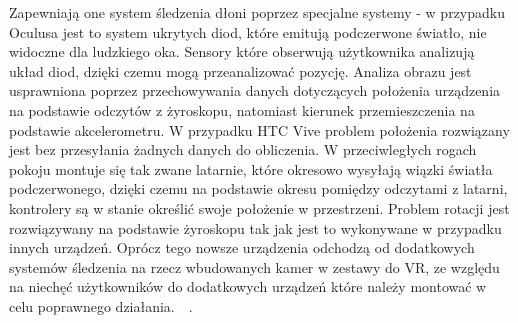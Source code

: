 Zapewniają one system śledzenia dłoni poprzez specjalne systemy - w przypadku Oculusa jest to system ukrytych diod, które emitują podczerwone światło, nie widoczne dla ludzkiego oka. Sensory które obserwują użytkownika analizują układ diod, dzięki czemu mogą przeanalizować pozycję. Analiza obrazu jest usprawniona poprzez przechowywania danych dotyczących położenia urządzenia na podstawie odczytów z żyroskopu, natomiast kierunek przemieszczenia na podstawie akcelerometru. W przypadku HTC Vive problem położenia rozwiązany jest bez przesyłania żadnych danych do obliczenia. W przeciwległych rogach pokoju montuje się tak zwane latarnie, które okresowo wysyłają wiązki światła podczerwonego, dzięki czemu na podstawie okresu pomiędzy odczytami z latarni, kontrolery są w stanie określić swoje położenie w przestrzeni. Problem rotacji jest rozwiązywany na podstawie żyroskopu tak jak jest to wykonywane w przypadku innych urządzeń. Oprócz tego nowsze urządzenia odchodzą od dodatkowych systemów śledzenia na rzecz wbudowanych kamer w zestawy do VR, ze względu na niechęć użytkowników do dodatkowych urządzeń które należy montować w celu poprawnego działania.~\cite{sledzenie}~\cite{kontroleryDZB}.


